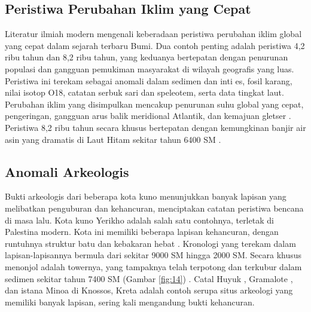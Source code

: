 \documentclass[10pt,twocolumn,letterpaper]{article}
\begin{document}
\subsection{Peristiwa Perubahan Iklim yang Cepat}

Literatur ilmiah modern mengenali keberadaan peristiwa perubahan iklim global yang cepat dalam sejarah terbaru Bumi. Dua contoh penting adalah peristiwa 4,2 ribu tahun dan 8,2 ribu tahun, yang keduanya bertepatan dengan penurunan populasi dan gangguan pemukiman masyarakat di wilayah geografis yang luas. Peristiwa ini terekam sebagai anomali dalam sedimen dan inti es, fosil karang, nilai isotop O18, catatan serbuk sari dan speleotem, serta data tingkat laut. Perubahan iklim yang disimpulkan mencakup penurunan suhu global yang cepat, pengeringan, gangguan arus balik meridional Atlantik, dan kemajuan gletser \cite{90,91,92}. Peristiwa 8,2 ribu tahun secara khusus bertepatan dengan kemungkinan banjir air asin yang dramatis di Laut Hitam sekitar tahun 6400 SM \cite{93}.

\subsection{Anomali Arkeologis}

Bukti arkeologis dari beberapa kota kuno menunjukkan banyak lapisan yang melibatkan penguburan dan kehancuran, menciptakan catatan peristiwa bencana di masa lalu. Kota kuno Yerikho adalah salah satu contohnya, terletak di Palestina modern. Kota ini memiliki beberapa lapisan kehancuran, dengan runtuhnya struktur batu dan kebakaran hebat \cite{96,97}. Kronologi yang terekam dalam lapisan-lapisannya bermula dari sekitar 9000 SM hingga 2000 SM. Secara khusus menonjol adalah towernya, yang tampaknya telah terpotong dan terkubur dalam sedimen sekitar tahun 7400 SM (Gambar \ref{fig:14}) \cite{95}. Catal Huyuk \cite{99}, Gramalote \cite{98}, dan istana Minoa di Knossos, Kreta \cite{100,101} adalah contoh serupa situs arkeologi yang memiliki banyak lapisan, sering kali mengandung bukti kehancuran.
\end{document}
